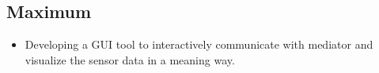 \documentclass[12pt]{article}
\begin{document}
\subsection{Maximum}
\begin{itemize}
\item Developing a GUI tool to interactively communicate with mediator and visualize the sensor data in a meaning way.
\end{itemize}

\newpage



\newpage
\end{document}
